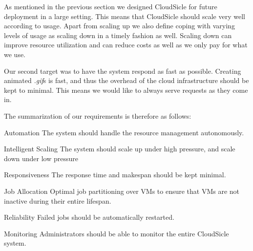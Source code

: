 \documentclass[twocolumn,twoside]{IEEEtran}
\begin{document}
As mentioned in the previous section we designed CloudSicle 
for future deployment in a large setting. This means that CloudSicle
should scale very well according to usage. Apart from scaling up
we also define coping with varying levels of usage as scaling down
in a timely fashion as well. Scaling down can improve resource utilization and can reduce costs as well as we only pay for what we use.

Our second target was to have the system respond as fast as
possible. Creating animated \textit{.gif}s is fast, and thus the overhead of the cloud infrastructure should be kept to minimal. This means we would like to always serve requests as they come in. 



The summarization of our requirements is therefore as follows:
\begin{LaTeXdescription}
\item[Automation] The system should handle the resource management autonomously. \hfill \
\item[Intelligent Scaling] The system should scale up under high pressure, and scale down under low pressure \hfill \
\item[Responsiveness] The response time and makespan should be kept minimal. \hfill \
\item[Job Allocation] Optimal job partitioning over VMs to ensure that VMs are not inactive during their entire lifespan.\hfill \
\item[Reliability] Failed jobs should be automatically restarted.\hfill \
\item[Monitoring] Administrators should be able to monitor the entire CloudSicle system.\hfill \
\end{LaTeXdescription}
\end{document}
